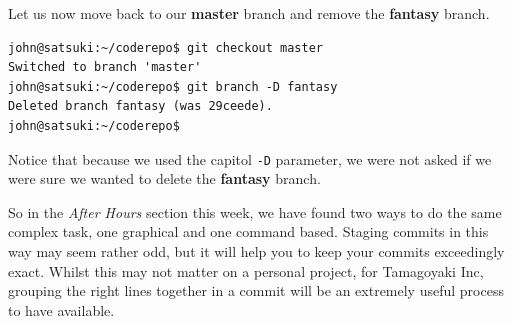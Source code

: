 Let us now move back to our \textbf{master} branch and remove the \textbf{fantasy} branch.

\begin{Verbatim}
john@satsuki:~/coderepo$ git checkout master
Switched to branch 'master'
john@satsuki:~/coderepo$ git branch -D fantasy
Deleted branch fantasy (was 29ceede).
john@satsuki:~/coderepo$ 
\end{Verbatim}

Notice that because we used the capitol \texttt{-D} parameter, we were not asked if we were sure we wanted to delete the \textbf{fantasy} branch.

So in the \emph{After Hours} section this week, we have found two ways to do the same complex task, one graphical and one command based.  Staging commits in this way may seem rather odd, but it will help you to keep your commits exceedingly exact.  Whilst this may not matter on a personal project, for Tamagoyaki Inc, grouping the right lines together in a commit will be an extremely useful process to have available.
